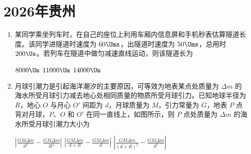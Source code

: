 \documentclass[\gkver]{gaokaozhenti}
\begin{document}
\chapter{2026年贵州}

\begin{enumerate}
\item
某同学乘坐列车时，在自己的座位上利用车厢内信息屏和手机秒表估算隧道长度。该同学进隧道时速度为 $60\Ums$，出隧道时速度为 $50\Ums$，总用时 $200\Us$。若列车在隧道中做匀减速直线运动，则该隧道长为 

\fourchoices[answer=C]
{$5000\Um$}
{$8000\Um$}
{$11000\Um$}
{$14000\Um$}


\item
月球引潮力是引起海洋潮汐的主要原因，可等效为地表某点处质量为 $\Delta m$ 的海水所受月球引力减去地心处相同质量的物质所受月球引力。已知地球半径为 $R$，地心 $O$ 与月心 $O'$ 间距为 $d$，月球质量为 $M$，引力常量为 $G$，地表 $P$ 点背对月球，$P$、$O$ 和 $O'$ 在同一直线上，如图所示，则 $P$ 点处质量为 $\Delta m$ 的海水所受月球引潮力大小为 

{$\left|\frac{GM\Delta m}{d^{2}}-\frac{GM\Delta m}{R^{2}}\right|$}
{$\left|\frac{GM\Delta m}{d+R}-\frac{GM\Delta m}{d}\right|$}
{$\left|\frac{GM\Delta m}{(d+R)^{2}}-\frac{GM\Delta m}{d^{2}}\right|$}


\end{enumerate}
\end{document}

